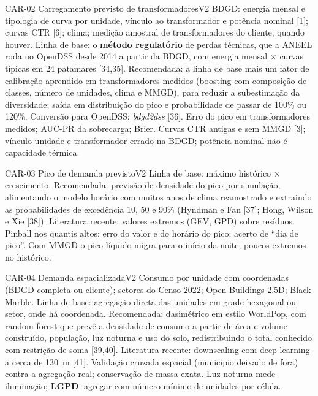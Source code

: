 \begin{ficha}{CAR-02 \textperiodcentered{} Carregamento previsto de transformadores}{V2}
 BDGD: energia mensal e tipologia de curva por unidade, vínculo
ao transformador e potência nominal [1]; curvas CTR [6]; clima; medição
amostral de transformadores do cliente, quando houver.
 Linha de base: o \textbf{método regulatório} de perdas
técnicas, que a ANEEL roda no OpenDSS desde 2014 a partir da BDGD, com
energia mensal × curvas típicas em 24 patamares [34,35]. Recomendada: a linha
de base mais um fator de calibração aprendido em transformadores medidos
(boosting com composição de classes, número de unidades, clima e MMGD), para
reduzir a subestimação da diversidade; saída em distribuição do pico e
probabilidade de passar de 100\% ou 120\%. Conversão para OpenDSS:
\emph{bdgd2dss} [36].
 Erro do pico em transformadores medidos; AUC-PR da
sobrecarga; Brier.
 Curvas CTR antigas e sem MMGD [3]; vínculo unidade e
transformador errado na BDGD; potência nominal não é capacidade térmica.
\end{ficha}

\begin{ficha}{CAR-03 \textperiodcentered{} Pico de demanda previsto}{V2}
 Linha de base: máximo histórico × crescimento.
Recomendada: previsão de densidade do pico por simulação, alimentando o
modelo horário com muitos anos de clima reamostrado e extraindo as
probabilidades de excedência 10, 50 e 90\% (Hyndman e Fan [37]; Hong, Wilson
e Xie [38]). Literatura recente: valores extremos (GEV, GPD) sobre resíduos.
 Pinball nos quantis altos; erro do valor e do horário do
pico; acerto de ``dia de pico''.
 Com MMGD o pico líquido migra para o início da noite;
poucos extremos no histórico.
\end{ficha}

\begin{ficha}{CAR-04 \textperiodcentered{} Demanda espacializada}{V2}
 Consumo por unidade com coordenadas (BDGD completa ou
cliente); setores do Censo 2022; Open Buildings 2.5D; Black Marble.
 Linha de base: agregação direta das unidades em grade
hexagonal ou setor, onde há coordenada. Recomendada: dasimétrico em estilo
WorldPop, com random forest que prevê a densidade de consumo a partir de área
e volume construído, população, luz noturna e uso do solo, redistribuindo o
total conhecido com restrição de soma [39,40]. Literatura recente:
downscaling com deep learning a cerca de 130~m [41].
 Validação cruzada espacial (município deixado de fora)
contra a agregação real; conservação de massa exata.
 Luz noturna mede iluminação; \textbf{LGPD}: agregar com
número mínimo de unidades por célula.
\end{ficha}

